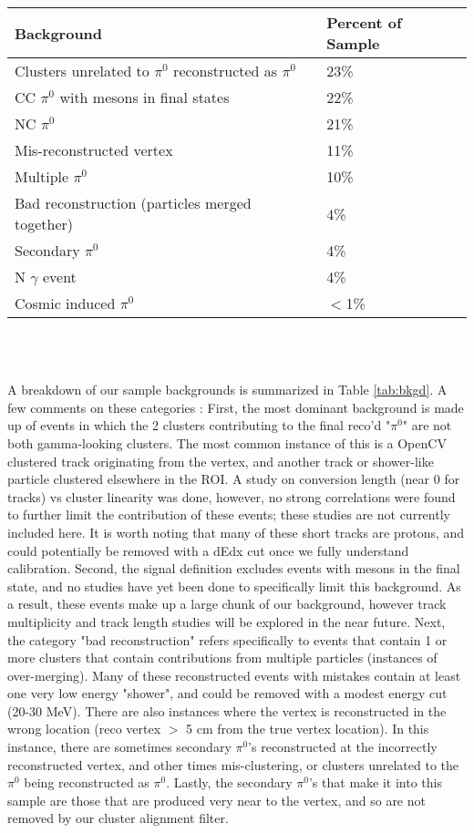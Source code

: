 \documentclass[a4paper]{article}
\begin{document}
\begin{minipage}{\linewidth}
\centering
{} \label{tab:bkgd} 
 \begin{tabular}{| l | l |}
 \hline
 Background & Percent of Sample \\ [0.5ex]
 \hline\hline
\hline
 Clusters unrelated to $\pi^0$ reconstructed as $\pi^0$ & 23\% \\ \hline
  CC $\pi^0$ with mesons in final states & 22\% \\ \hline
  NC $\pi^0$ & 21\% \\ \hline
Mis-reconstructed vertex & 11\% \\ 
 \hline
 Multiple $\pi^0$ & 10\% \\ \hline
 Bad reconstruction (particles merged together) & 4\% \\ \hline
Secondary $\pi^0$ & 4\% \\ \hline 
N $\gamma$ event & 4\% \\ \hline 
Cosmic induced $\pi^0$ & $<$1\% \\ \hline 
 
   \end{tabular}
\end{minipage}
\\\\
\par A breakdown of our sample backgrounds is summarized in Table \ref{tab:bkgd}. A few comments on these categories : First, the most dominant background is made up of events in which the 2 clusters contributing to the final reco'd "$\pi^0$" are not both gamma-looking clusters. The most common instance of this is a OpenCV clustered track originating from the vertex, and another track or shower-like particle clustered elsewhere in the ROI. A study on conversion length (near 0 for tracks) vs cluster linearity was done, however, no strong correlations were found to further limit the contribution of these events; these studies are not currently included here. It is worth noting that many of these short tracks are protons, and could potentially be removed with a dEdx cut once we fully understand calibration. Second, the signal definition excludes events with mesons in the final state, and no studies have yet been done to specifically limit this background. As a result, these events make up a large chunk of our background, however track multiplicity and track length studies will be explored in the near future. Next, the category "bad reconstruction" refers specifically to events that contain 1 or more clusters that contain contributions from multiple particles (instances of over-merging). Many of these reconstructed events with mistakes contain at least one very low energy "shower", and could  be removed with a modest energy cut (20-30 MeV).  There are also instances where the vertex is reconstructed in the wrong location (reco vertex $>$ 5 cm from the true vertex location). In this instance, there are sometimes secondary $\pi^0$'s reconstructed at the incorrectly reconstructed vertex, and other times mis-clustering, or clusters unrelated to the $\pi^0$ being reconstructed as $\pi^0$. Lastly, the secondary $\pi^0$'s that make it into this sample are those that are produced very near to the vertex, and so are not removed by our cluster alignment filter. 
\end{document}
